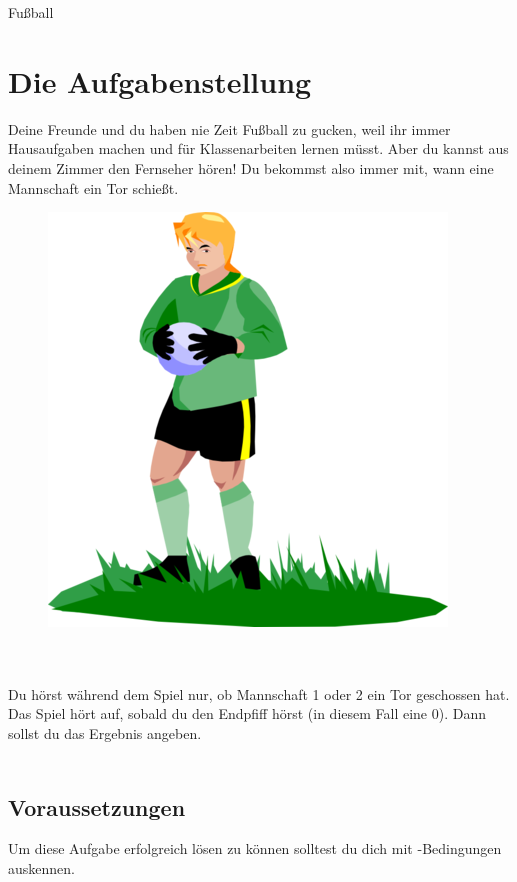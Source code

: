 \documentclass{\VorlagenPfad/coderdojokatext}
\newcommand{\Titel}{Fußball}
\begin{document}
	\setcounter{chapter}{1}
	
	\begin{center}
		{\huge \Titel}
	\end{center}
	
	\section{Die Aufgabenstellung} Deine Freunde und du haben nie Zeit Fußball zu gucken, weil ihr immer Hausaufgaben machen und für Klassenarbeiten lernen müsst. Aber du kannst aus deinem Zimmer den Fernseher hören! Du bekommst also immer mit, wann eine Mannschaft ein Tor schießt.
	\\
	\begin{figure}[h]
	\includegraphics[scale=0.4]{Fussball_Bild}
	\centering
	\end{figure}
	\\ \\
	
	Du hörst während dem Spiel nur, ob Mannschaft 1 oder 2 ein Tor geschossen hat. Das Spiel hört auf, sobald du den Endpfiff hörst (in diesem Fall eine 0). Dann sollst du das Ergebnis angeben.
	\\ \\
	
	\subsection{Voraussetzungen} Um diese Aufgabe erfolgreich lösen zu können solltest du dich mit -Bedingungen auskennen.
	
\end{document}
